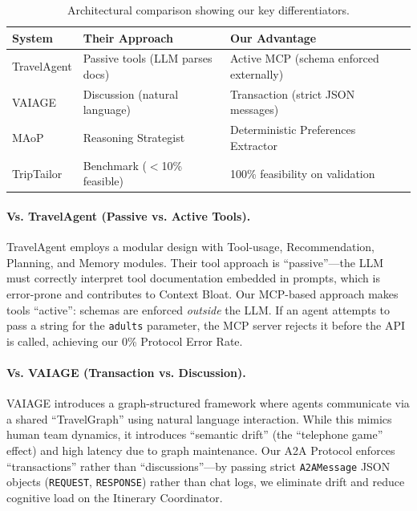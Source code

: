 \documentclass[10pt,twocolumn]{article}
\begin{document}
\begin{table}[!htbp]
\centering
\small
\begin{tabular}{p{1.8cm}p{2.5cm}p{2.8cm}}
\toprule
\textbf{System} & \textbf{Their Approach} & \textbf{Our Advantage} \\
\midrule
TravelAgent & Passive tools (LLM parses docs) & Active MCP (schema enforced externally) \\
VAIAGE & Discussion (natural language) & Transaction (strict JSON messages) \\
MAoP & Reasoning Strategist & Deterministic Preferences Extractor \\
TripTailor & Benchmark ($<$10\% feasible) & 100\% feasibility on validation \\
\bottomrule
\end{tabular}
\caption{Architectural comparison showing our key differentiators.}
\label{tab:arch_comparison}
\end{table}

\paragraph{Vs. TravelAgent (Passive vs. Active Tools).}
TravelAgent \cite{chen2024travelagent} employs a modular design with Tool-usage, Recommendation, Planning, and Memory modules. Their tool approach is ``passive''---the LLM must correctly interpret tool documentation embedded in prompts, which is error-prone and contributes to Context Bloat. Our MCP-based approach makes tools ``active'': schemas are enforced \textit{outside} the LLM. If an agent attempts to pass a string for the \texttt{adults} parameter, the MCP server rejects it before the API is called, achieving our 0\% Protocol Error Rate.

\paragraph{Vs. VAIAGE (Transaction vs. Discussion).}
VAIAGE \cite{ge2025vaiage} introduces a graph-structured framework where agents communicate via a shared ``TravelGraph'' using natural language interaction. While this mimics human team dynamics, it introduces ``semantic drift'' (the ``telephone game'' effect) and high latency due to graph maintenance. Our A2A Protocol enforces ``transactions'' rather than ``discussions''---by passing strict \texttt{A2AMessage} JSON objects (\texttt{REQUEST}, \texttt{RESPONSE}) rather than chat logs, we eliminate drift and reduce cognitive load on the Itinerary Coordinator.
\end{document}
